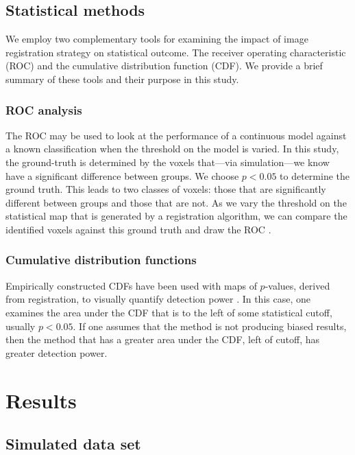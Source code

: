 \documentclass[final,5p,times,twocolumn]{elsarticle}
\begin{document}
\subsection{Statistical methods} 
We employ two complementary tools for examining the impact of image 
registration strategy on statistical outcome.  The receiver operating
characteristic (ROC) and the cumulative distribution function (CDF).
We provide a brief summary of these tools and their purpose in this study.
\subsubsection{ROC analysis} 
The ROC may be used to look at the performance of a continuous model
against a known classification when the threshold on the model is
varied.  In this study, the ground-truth is determined by the voxels
that---via simulation---we know have a significant difference between
groups.  We choose $p<0.05$ to determine the
ground truth.  This leads to two classes of voxels: those that are
significantly different between groups and those that are not.  As we
vary the threshold on the statistical map that is generated by a
registration algorithm, we can compare the identified voxels against
this ground truth and draw the ROC \citep{Fitzpatrick1998,Wenzel2010}. 

\subsubsection{Cumulative distribution functions} 
Empirically constructed CDFs have been used with maps of $p$-values,
derived from registration, to visually quantify detection power
\citep{Brun2008,Hua2009}.  In this case, one examines the area under the
CDF that is to the left of some statistical cutoff, usually $p<0.05$.  If one assumes
that the method is not producing biased results, then the method that
has a greater area under the CDF, left of cutoff, has greater
detection power.  

\section{Results}

\subsection{Simulated data set} 
\end{document}
